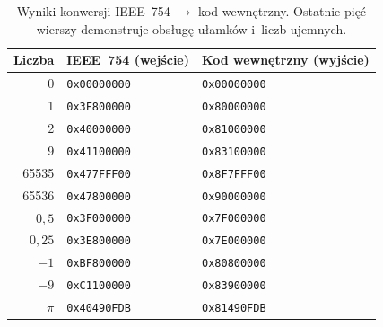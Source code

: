 \documentclass[12pt,a4paper]{article}
\begin{document}
\begin{table}[H]
\centering
\begin{tabular}{rll}
\toprule
\textbf{Liczba} & \textbf{IEEE~754 (wejście)} & \textbf{Kod wewnętrzny (wyjście)} \\
\midrule
0       & \texttt{0x00000000} & \texttt{0x00000000} \\
1       & \texttt{0x3F800000} & \texttt{0x80000000} \\
2       & \texttt{0x40000000} & \texttt{0x81000000} \\
9       & \texttt{0x41100000} & \texttt{0x83100000} \\
65535   & \texttt{0x477FFF00} & \texttt{0x8F7FFF00} \\
65536   & \texttt{0x47800000} & \texttt{0x90000000} \\
\midrule
$0{,}5$  & \texttt{0x3F000000} & \texttt{0x7F000000} \\
$0{,}25$ & \texttt{0x3E800000} & \texttt{0x7E000000} \\
$-1$     & \texttt{0xBF800000} & \texttt{0x80800000} \\
$-9$     & \texttt{0xC1100000} & \texttt{0x83900000} \\
$\pi$    & \texttt{0x40490FDB} & \texttt{0x81490FDB} \\
\bottomrule
\end{tabular}
\caption{Wyniki konwersji IEEE~754 $\to$ kod wewnętrzny. Ostatnie pięć wierszy
         demonstruje obsługę ułamków i~liczb ujemnych.}
\end{table}
\end{document}
